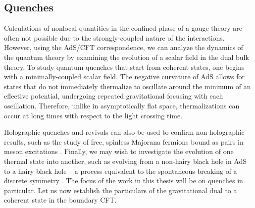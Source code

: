 \documentclass[../PhD.tex]{subfiles}
\begin{document}

\subsection{Quenches}
\label{sub: quenches}

Calculations of nonlocal quantities in the confined phase of a gauge theory are often not possible due to the strongly-coupled nature of the interactions. However, using the AdS/CFT correspondence, we can analyze the dynamics of the quantum theory by examining the evolution of a scalar field in the dual bulk theory. To study quantum quenches that start from coherent states, one begins with a minimally-coupled scalar field. The negative curvature of AdS allows for states that do not immediately thermalize to oscillate around the minimum of an effective potential, undergoing repeated gravitational focusing with each oscillation. Therefore, unlike in asymptotically flat space, thermalizations can occur at long times with respect to the light crossing time. 

Holographic quenches and revivals can also be used to confirm non-holographic results, such as the study of free, spinless Majorana fermions bound as pairs in meson excitations \cite{1706.02438}. Finally, we may wish to investigate the evolution of one thermal state into another, such as evolving from a non-hairy black hole in AdS to a hairy black hole -- a process equivalent to the spontaneous breaking of a discrete symmetry \cite{1704.05454}. The focus of the work in this thesis will be on quenches in particular. Let us now establish the particulars of the gravitational dual to a coherent state in the boundary CFT. 

\end{document}
